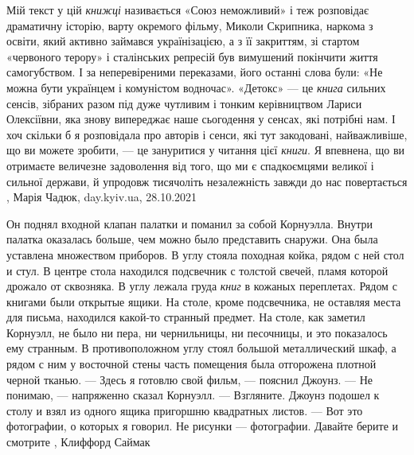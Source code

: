 Мій текст у цій \emph{книжці} називається «Союз неможливий» і теж розповідає
драматичну історію, варту окремого фільму, Миколи Скрипника, наркома з освіти,
який активно займався українізацією, а з її закриттям, зі стартом «червоного
терору» і сталінських репресій був вимушений покінчити життя самогубством. І за
неперевіреними переказами, його останні слова були: «Не можна бути українцем і
комуністом водночас». «Детокс» — це \emph{книга} сильних сенсів, зібраних
разом під дуже чутливим і тонким керівництвом Лариси Олексіївни, яка знову
випереджає наше сьогодення у сенсах, які потрібні нам. І хоч скільки б я
розповідала про авторів і сенси, які тут закодовані, найважливіше, що ви можете
зробити, — це зануритися у читання цієї \emph{книги}. Я впевнена, що ви
отримаєте величезне задоволення від того, що ми є спадкоємцями великої і
сильної держави, й упродовж тисячоліть незалежність завжди до нас повертається
, 
Марія Чадюк, day.kyiv.ua, 28.10.2021

Он поднял входной клапан палатки и поманил за собой Корнуэлла. Внутри палатка
оказалась больше, чем можно было представить снаружи. Она была уставлена
множеством приборов. В углу стояла походная койка, рядом с ней стол и стул. В
центре стола находился подсвечник с толстой свечей, пламя которой дрожало от
сквозняка. В углу лежала груда \emph{книг} в кожаных переплетах. Рядом с
книгами были открытые ящики. На столе, кроме подсвечника, не оставляя места для
письма, находился какой-то странный предмет. На столе, как заметил Корнуэлл, не
было ни пера, ни чернильницы, ни песочницы, и это показалось ему странным. В
противоположном углу стоял большой металлический шкаф, а рядом с ним у
восточной стены часть помещения была отгорожена плотной черной тканью.  — Здесь
я готовлю свой фильм, — пояснил Джоунз.  — Не понимаю, — напряженно сказал
Корнуэлл.  — Взгляните.  Джоунз подошел к столу и взял из одного ящика
пригоршню квадратных листов.  — Вот это фотографии, о которых я говорил. Не
рисунки — фотографии. Давайте берите и смотрите
, Клиффорд Саймак
